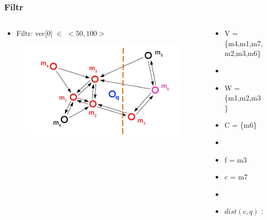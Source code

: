 \documentclass{beamer}
\begin{document}
	\begin{frame}
		\frametitle{Filtr}
		\begin{columns}[T] %
			
			\begin{column}{.6\textwidth}
				
				\begin{itemize}
					\item[] Filtr: vec[0] $\in$ $<50,100>$
				\end{itemize}
				
				\begin{figure}
					\includegraphics[scale=0.3]{figures/Filtry_b1.png}
				\end{figure}
			\end{column}%
			\hfill%
			\begin{column}{.4\textwidth}
				\begin{itemize}
					\item V = \{m4,m1,m7,m2,m3,m6\}
					\item[]
					\item W = \{m1,m2,m3\}
					\item C = \{m6\}
					\item[]
					\item f = m3
					\item c = m7
					\item[]
					\item $dist(c,q) > dist(f,q) $
				\end{itemize}
			\end{column}%
		\end{columns}
	\end{frame}
\end{document}
